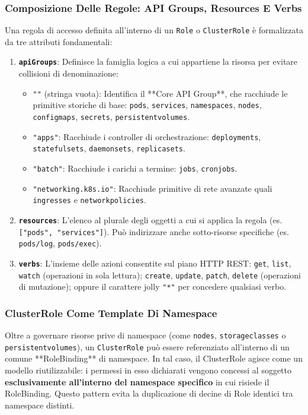 \documentclass[11pt, a4paper]{article}
\begin{document}
\subsubsection{Composizione Delle Regole: API Groups, Resources E Verbs}
Una regola di accesso definita all'interno di un \texttt{Role} o \texttt{ClusterRole} è formalizzata da tre attributi fondamentali:
\begin{enumerate}
    \item \textbf{\texttt{apiGroups}}: Definisce la famiglia logica a cui appartiene la risorsa per evitare collisioni di denominazione:
    \begin{itemize}[noitemsep]
        \item \texttt{""} (stringa vuota): Identifica il **Core API Group**, che racchiude le primitive storiche di base: \texttt{pods}, \texttt{services}, \texttt{namespaces}, \texttt{nodes}, \texttt{configmaps}, \texttt{secrets}, \texttt{persistentvolumes}.
        \item \texttt{"apps"}: Racchiude i controller di orchestrazione: \texttt{deployments}, \texttt{statefulsets}, \texttt{daemonsets}, \texttt{replicasets}.
        \item \texttt{"batch"}: Racchiude i carichi a termine: \texttt{jobs}, \texttt{cronjobs}.
        \item \texttt{"networking.k8s.io"}: Racchiude primitive di rete avanzate quali \texttt{ingresses} e \texttt{networkpolicies}.
    \end{itemize}
    \item \textbf{\texttt{resources}}: L'elenco al plurale degli oggetti a cui si applica la regola (es. \texttt{["pods", "services"]}). Può indirizzare anche sotto-risorse specifiche (es. \texttt{pods/log}, \texttt{pods/exec}).
    \item \textbf{\texttt{verbs}}: L'insieme delle azioni consentite sul piano HTTP REST: \texttt{get}, \texttt{list}, \texttt{watch} (operazioni in sola lettura); \texttt{create}, \texttt{update}, \texttt{patch}, \texttt{delete} (operazioni di mutazione); oppure il carattere jolly \texttt{"*"} per concedere qualsiasi verbo.
\end{enumerate}

\subsubsection{ClusterRole Come Template Di Namespace}
Oltre a governare risorse prive di namespace (come \texttt{nodes}, \texttt{storageclasses} o \texttt{persistentvolumes}), un \texttt{ClusterRole} può essere referenziato all'interno di un comune **RoleBinding** di namespace. In tal caso, il ClusterRole agisce come un modello riutilizzabile: i permessi in esso dichiarati vengono concessi al soggetto \textbf{esclusivamente all'interno del namespace specifico} in cui risiede il RoleBinding. Questo pattern evita la duplicazione di decine di Role identici tra namespace distinti.
\end{document}

